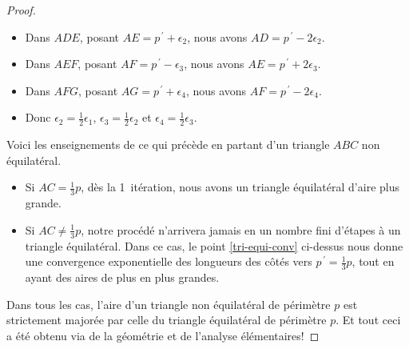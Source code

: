 \begin{proof}
\begin{enumerate}
\begin{itemize}
			\item Dans $ADE$, posant $AE = p^{\,\prime} + \epsilon_2$, nous avons $AD = p^{\,\prime} - 2 \epsilon_2$.

			\item Dans $AEF$, posant $AF = p^{\,\prime} - \epsilon_3$, nous avons $AE = p^{\,\prime} + 2 \epsilon_3$.

			\item Dans $AFG$, posant $AG = p^{\,\prime} + \epsilon_4$, nous avons $AF = p^{\,\prime} - 2 \epsilon_4$.

			\item Donc
			$\epsilon_2 = \frac12 \epsilon_1$,
			$\epsilon_3 = \frac12 \epsilon_2$
			et
			$\epsilon_4 = \frac12 \epsilon_3$.
		\end{itemize}
	\end{enumerate}


	\smallskip
	
	Voici les enseignements de ce qui précède en partant d'un triangle $ABC$ non équilatéral.
	\begin{itemize}
		\item Si $AC = \frac13p$, dès la 1\iere\ itération, nous avons un triangle équilatéral d'aire plus grande.
		
		
		\item Si $AC \neq \frac13p$, notre procédé n'arrivera jamais en un nombre fini d'étapes à un triangle équilatéral.
		Dans ce cas, le point \ref{tri-equi-conv} ci-dessus nous donne une convergence exponentielle des longueurs des côtés vers $p^{\,\prime} = \frac13 p$, tout en ayant des aires de plus en plus grandes.
	\end{itemize}
	
	Dans tous les cas, l'aire d'un triangle non équilatéral de périmètre $p$ est strictement majorée par celle du triangle équilatéral de périmètre $p$. Et tout ceci a été obtenu via de la géométrie et de l'analyse élémentaires!
\end{proof}
